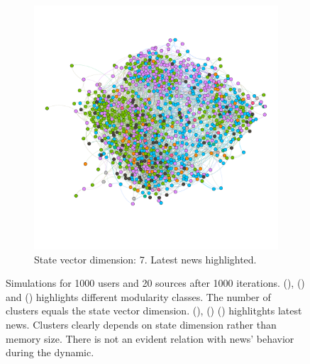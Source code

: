 \begin{figure}
\begin{subfigure}[t]{0.35\textwidth}
    \includegraphics[width=\textwidth]{img/dim7_news.pdf}
    \caption{State vector dimension: 7.
      Latest news highlighted.}
    \label{fig:bubble7news}
  \end{subfigure}
  \caption[Network results: bubble chambers]{Simulations for 1000 users and 20 sources after 1000
    iterations. (), () and
    () highlights different modularity classes.
    The number of clusters equals the state vector dimension.
    (), ()
    () highlitghts latest news.
    Clusters clearly depends on state dimension rather than memory
    size. There is not an evident relation with news' behavior
    during the dynamic.
  }
  \label{fig:test}
\end{figure}
